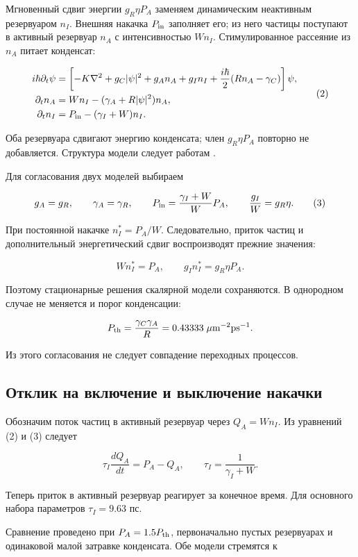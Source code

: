 \documentclass[12pt,a4paper]{article}
\begin{document}
Мгновенный сдвиг энергии \(g_R\eta P_A\) заменяем динамическим неактивным резервуаром \(n_I\). Внешняя накачка \(P_{\rm in}\) заполняет его; из него частицы поступают в активный резервуар \(n_A\) с интенсивностью \(Wn_I\). Стимулированное рассеяние из \(n_A\) питает конденсат:

\[
\begin{aligned}
i\hbar\partial_t\psi&=\left[-K\nabla^2+g_C|\psi|^2+g_A n_A+g_I n_I
+\frac{i\hbar}{2}(Rn_A-\gamma_C)\right]\psi,\\
\partial_t n_A&=Wn_I-(\gamma_A+R|\psi|^2)n_A,\\
\partial_t n_I&=P_{\rm in}-(\gamma_I+W)n_I.
\end{aligned}
\tag{2}\label{eq:2}
\]

Оба резервуара сдвигают энергию конденсата; член \(g_R\eta P_A\) повторно не добавляется. Структура модели следует работам \cite{ref1,ref2}.

Для согласования двух моделей выбираем

\[
g_A=g_R,\qquad \gamma_A=\gamma_R,\qquad
P_{\rm in}=\frac{\gamma_I+W}{W}P_A,\qquad
\frac{g_I}{W}=g_R\eta.
\tag{3}\label{eq:3}
\]

При постоянной накачке \(n_I^*=P_A/W\). Следовательно, приток частиц и дополнительный энергетический сдвиг воспроизводят прежние значения:

\[
Wn_I^*=P_A,\qquad g_I n_I^*=g_R\eta P_A.
\]

Поэтому стационарные решения скалярной модели сохраняются. В однородном случае не меняется и порог конденсации:

\[
P_{\rm th}=\frac{\gamma_C\gamma_A}{R}
=0.43333\;\mu\mathrm m^{-2}\mathrm{ps}^{-1}.
\]

Из этого согласования не следует совпадение переходных процессов.

\subsection{Отклик на включение и выключение накачки}

Обозначим поток частиц в активный резервуар через \(Q_A=Wn_I\). Из уравнений (2) и (3) следует

\[
\tau_I\frac{dQ_A}{dt}=P_A-Q_A,
\qquad \tau_I=\frac{1}{\gamma_I+W}.
\tag{4}\label{eq:4}
\]

Теперь приток в активный резервуар реагирует за конечное время. Для основного набора параметров \(\tau_I=9.63\) пс.

Сравнение проведено при \(P_A=1.5P_{\rm th}\), первоначально пустых резервуарах и одинаковой малой затравке конденсата. Обе модели стремятся к
\end{document}
